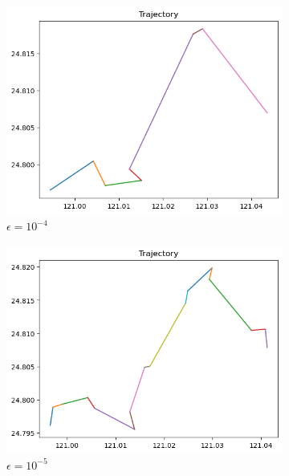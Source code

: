 \documentclass[12pt, a4paper]{article}
\begin{document}
\begin{figure}[htbp]
\centering
\begin{subfigure}{.475\linewidth}
\includegraphics[width=\linewidth]{q3_a}
\caption{$\epsilon=10^{-4}$}
\end{subfigure}
\begin{subfigure}{.475\linewidth}
\includegraphics[width=\linewidth]{q3_b}
\caption{$\epsilon=10^{-5}$}
\end{subfigure}
\begin{subfigure}{.475\linewidth}

\end{subfigure}
\end{figure}
\end{document}
